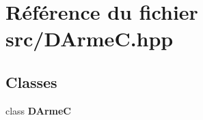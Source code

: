 \section{Référence du fichier src/\-D\-Arme\-C.hpp}
\label{_d_arme_c_8hpp}
\subsection*{Classes}
\begin{DoxyCompactItemize}
\item 
class {\bf D\-Arme\-C}
\end{DoxyCompactItemize}

